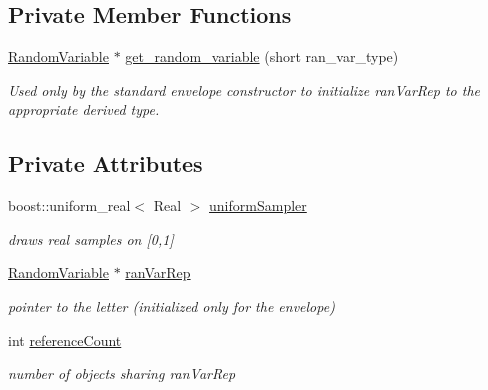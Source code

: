 \subsection*{Private Member Functions}
\begin{DoxyCompactItemize}
\item 
\hyperlink{classPecos_1_1RandomVariable}{Random\+Variable} $\ast$ \hyperlink{classPecos_1_1RandomVariable_a4b0f2612c428cc371532951e371cdb3d}{get\+\_\+random\+\_\+variable} (short ran\+\_\+var\+\_\+type)
\begin{DoxyCompactList}\small\item\em Used only by the standard envelope constructor to initialize ran\+Var\+Rep to the appropriate derived type. \end{DoxyCompactList}\end{DoxyCompactItemize}
\subsection*{Private Attributes}
\begin{DoxyCompactItemize}
\item 
boost\+::uniform\+\_\+real$<$ Real $>$ \hyperlink{classPecos_1_1RandomVariable_aad8c21125db1046e3c2f9453b72538ad}{uniform\+Sampler}\label{classPecos_1_1RandomVariable_aad8c21125db1046e3c2f9453b72538ad}

\begin{DoxyCompactList}\small\item\em draws real samples on \mbox{[}0,1\mbox{]} \end{DoxyCompactList}\item 
\hyperlink{classPecos_1_1RandomVariable}{Random\+Variable} $\ast$ \hyperlink{classPecos_1_1RandomVariable_a2f48269331e2b061b0d4ed9bd70fe409}{ran\+Var\+Rep}\label{classPecos_1_1RandomVariable_a2f48269331e2b061b0d4ed9bd70fe409}

\begin{DoxyCompactList}\small\item\em pointer to the letter (initialized only for the envelope) \end{DoxyCompactList}\item 
int \hyperlink{classPecos_1_1RandomVariable_afff0b6144883d3ca09a8d0d3f4776b0f}{reference\+Count}\label{classPecos_1_1RandomVariable_afff0b6144883d3ca09a8d0d3f4776b0f}

\begin{DoxyCompactList}\small\item\em number of objects sharing ran\+Var\+Rep \end{DoxyCompactList}\end{DoxyCompactItemize}


